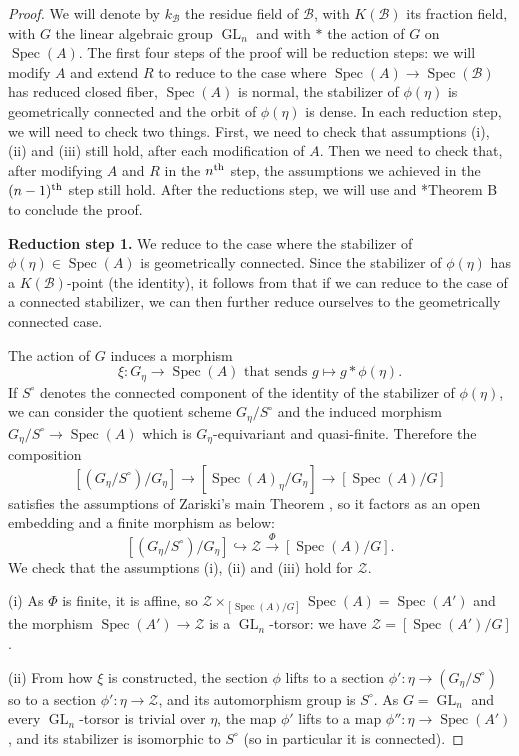 \documentclass{amsart}
\newcommand{\cB}{\mathcal{B}}
\newcommand{\cZ}{\mathcal{Z}}
\newcommand{\qB}{R}
\newcommand{\qR}{\cB}
\newcommand{\spec}{\operatorname{Spec}}
\newcommand{\GL}{\operatorname{GL}}
\theoremstyle{definition}
\begin{document}
\begin{proof}
We will denote by $k_\qR$ the residue field of $\qR$, with $K(\qR)$ its fraction field, with $G$ the linear algebraic group $\GL_n$ and with $\ast$ the action of $G$ on $\spec(A)$. 
The first four steps of the proof will be reduction steps: we will modify $A$ and extend $\qB$ to reduce to the case where $\spec(A)\to \spec(\qR)$ has reduced closed fiber, $\spec(A)$ is normal, the stabilizer of $\phi(\eta)$ is geometrically connected and the orbit of $\phi(\eta)$ is dense. In each reduction step, we will need to check two things. First, we need to check that assumptions (i), (ii) and (iii) still hold, after each modification of $A$. Then we need to check that, after modifying $A$ and $\qB$ in the $n^{\rm th}$ step, the assumptions we achieved in the $(n-1)^{\rm th}$ step still hold.
After the reductions step, we will use  and \cite{rydh2011etale}*{Theorem B} to conclude the proof.

\textbf{Reduction step 1.} We reduce to the case where the stabilizer of $\phi(\eta)\in \spec(A)$ is geometrically connected.
Since the stabilizer of $\phi(\eta)$ has a $K(\qR)$-point (the identity), it follows from \cite[Exercise 3.2.11]{liubook} that if we can reduce to the case of a connected stabilizer, we can then further reduce ourselves to the geometrically connected case.

The action of $G$ induces a morphism $$\xi: G_\eta\to \spec(A)\text{ that sends }g\mapsto g*\phi(\eta).$$ If $S^\circ$ denotes the connected component of the identity of the stabilizer of $\phi(\eta)$, we can consider the quotient scheme $G_\eta /S^\circ$ and the induced morphism $G_\eta/S^\circ \to \spec(A)$ which is $G_\eta$-equivariant and quasi-finite. Therefore the composition 
$$[(G_\eta/S^\circ)/G_\eta] \longrightarrow [\spec(A)_\eta/G_\eta]\longrightarrow [\spec(A)/G]$$
satisfies the assumptions of Zariski's main Theorem \cite[Théorème 16.5]{LMB}, so it factors as an open embedding and a finite morphism as below:
$$[(G_\eta/S^\circ)/G_\eta] \hookrightarrow \cZ\xrightarrow{\Phi} [\spec(A)/G].$$
We check that the assumptions (i), (ii) and (iii) hold for $\cZ$.

(i) As $\Phi$ is finite, it is affine, so $\cZ\times_{[\spec(A)/G]}\spec(A) = \spec(A')$ and the morphism $\spec(A')\to \cZ$ is a $\GL_n$-torsor: we have $\cZ=[\spec(A')/G]$.

(ii) From how $\xi$ is constructed, the section $\phi$ lifts to a section $\phi':\eta \to (G_\eta/S^\circ)$ so to a section $\phi':\eta\to \cZ$, and its automorphism group is $S^\circ$. As $G=\GL_n$ and every $\GL_n$-torsor is trivial over $\eta$, the map $\phi'$ lifts to a map $\phi'':\eta\to \spec(A')$, and its stabilizer is isomorphic to $S^\circ$ (so in particular it is connected).


\end{proof}
\end{document}
